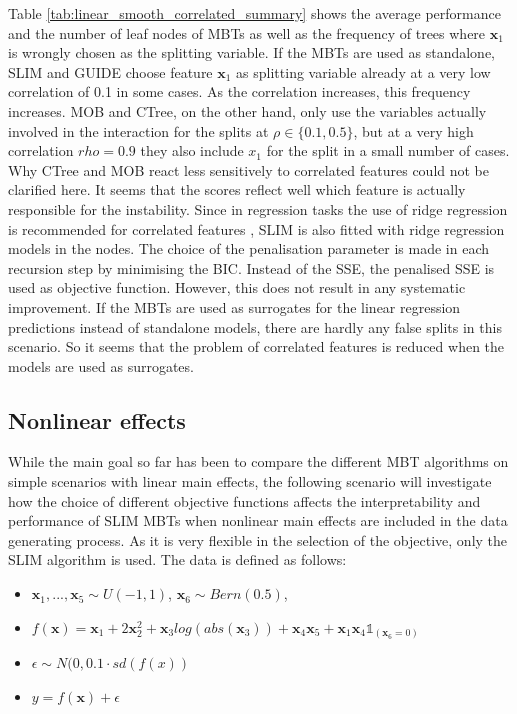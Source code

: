 Table \ref{tab:linear_smooth_correlated_summary} shows the average performance and the number of leaf nodes of MBTs  as well as the frequency of trees where $\textbf{x}_1$ is wrongly chosen as the splitting variable.
If the MBTs are used as standalone, SLIM and GUIDE choose feature $\textbf{x}_1$ as splitting variable already at a very low correlation of 0.1 in some cases. As the correlation increases, this frequency increases. MOB and CTree, on the other hand, only use the variables actually involved in the interaction for the splits at $\rho \in \{0.1, 0.5\}$, but at a very high correlation $rho = 0.9$ they also include $x_1$ for the split in a small number of cases. Why CTree and MOB react less sensitively to correlated features could not be clarified here. It seems that the scores reflect well which feature is actually responsible for the instability.
Since in regression tasks the use of ridge regression is recommended for correlated features \citep{McDonald.2009}, SLIM is also fitted with ridge regression models in the nodes. The choice of the penalisation parameter is made in each recursion step by minimising the BIC. Instead of the SSE, the penalised SSE is used as objective function. However, this does not result in any systematic improvement. 
If the MBTs are used as surrogates for the linear regression predictions instead of standalone models, there are hardly any false splits in this scenario. So it seems that the problem of correlated features is reduced when the models are used as surrogates.





\subsection{Nonlinear effects}
While the main goal so far has been to compare the different MBT algorithms on simple scenarios with linear main effects, the following scenario will investigate how the choice of different objective functions affects the interpretability and performance of SLIM MBTs when nonlinear main effects are included in the data generating process. 
As it is very flexible in the selection of the objective, only the SLIM algorithm is used. The data is defined as follows:

\begin{itemize}
    \item $\textbf{x}_1, ..., \textbf{x}_5 \sim U(-1,1)$, $\textbf{x}_6 \sim Bern(0.5)$, 
    \item $ f(\textbf{x}) = \textbf{x}_1 + 2 \textbf{x}_2^2 + \textbf{x}_3log(abs(\textbf{x}_3)) + \textbf{x}_4\textbf{x}_5 + \textbf{x}_1\textbf{x}_4\mathbb{1}_{(\textbf{x}_6 = 0)}$
    \item $\epsilon \sim N(0,  0.1 \cdot sd(f(x))$
    \item $y = f(\textbf{x}) + \epsilon$     
\end{itemize}

